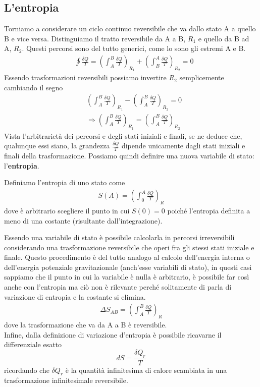 \documentclass[
10pt, %
a4paper, %
oneside, %
headinclude,footinclude, %
BCOR5mm, %
]{scrartcl}
\begin{document}
\subsection{L'entropia}
Torniamo a considerare un ciclo continuo reversibile che va dallo stato A a quello B e vice versa. Distinguiamo il tratto reversibile da A a B, \(R_1\) e quello da B ad A, \(R_2\). Questi percorsi sono del tutto generici, come lo sono gli estremi A e B. 
\begin{align*}
	&\oint \frac{\delta Q}{T} = \left(\int_A^B  \frac{\delta Q}{T}\right)_{R_1} + \left(\int_B^A \frac{\delta Q}{T}\right)_{R_2}  = 0
\end{align*}
Essendo trasformazioni reversibili possiamo invertire \(R_2\) semplicemente cambiando il segno
\begin{align*}
	&\left(\int_A^B \frac{\delta Q}{T}\right)_{R_1} -\left(\int_A^B \frac{\delta Q}{T}\right)_{R_2} = 0  \\
	&\Rightarrow \left(\int_A^B \frac{\delta Q}{T}\right)_{R_1}   = \left(\int_A^B \frac{\delta Q}{T}\right)_{R_2} 
\end{align*}
Vista l'arbitrarietà dei percorsi e degli stati iniziali e finali, se ne deduce che, qualunque essi siano, la grandezza \(\frac{\delta Q}{T}\) dipende unicamente dagli stati iniziali e finali della trasformazione. Possiamo quindi definire una nuova variabile di stato: l'\textbf{entropia}.
\begin{definition}[Entropia]
	Definiamo l'entropia di uno stato come 
	\begin{align*}
		S(A) = \left(\int_0^A \frac{\delta Q}{T}\right)_{R}
	\end{align*}
	dove è arbitrario scegliere il punto in cui \(S(0)=0\) poiché l'entropia  definita a meno di una costante (risultante dall'integrazione).
\end{definition}
Essendo una variabile di stato è possibile calcolarla in percorsi irreversibili considerando una trasformazione reversibile che operi fra gli stessi stati iniziale e finale. Questo procedimento è del tutto analogo al calcolo dell'energia interna o dell'energia potenziale gravitazionale (anch'esse variabili di stato), in questi casi sappiamo che il punto in cui la variabile è nulla è arbitrario, è possibile far così anche con l'entropia ma ciò non è rilevante perché solitamente di parla di variazione di entropia e la costante si elimina. 
\begin{align*}
	\Delta S_{AB} = \left(\int_A^B \frac{\delta Q}{T}\right)_R
\end{align*}
dove la trasformazione che va da A a B è reversibile.\\
Infine, dalla definizione di variazione d'entropia è possibile ricavarne il differenziale esatto 
\[dS = \frac{\delta Q_r}{T}\]
ricordando che \(\delta Q_r\) è la quantità infinitesima di calore scambiata in una trasformazione infinitesimale reversibile.
\end{document}
